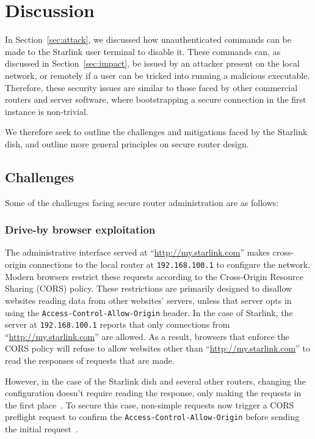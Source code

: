 \section{Discussion}\label{sec:discussion}

In Section~\ref{sec:attack}, we discussed how unauthenticated commands can be made to the Starlink user terminal to disable it.
These commands can, as discussed in Section~\ref{sec:impact}, be issued by an attacker present on the local network, or remotely if a user can be tricked into running a malicious executable.
Therefore, these security issues are similar to those faced by other commercial routers and server software, where bootstrapping a secure connection in the first instance is non-trivial.

We therefore seek to outline the challenges and mitigations faced by the Starlink dish, and outline more general principles on secure router design.

\subsection{Challenges}

Some of the challenges facing secure router administration are as follows:

\subsubsection{Drive-by browser exploitation}

The administrative interface served at ``\url{http://my.starlink.com}'' makes cross-origin connections to the local router at \texttt{192.168.100.1} to configure the network.
Modern browsers restrict these requests according to the Cross-Origin Resource Sharing (CORS) policy.
These restrictions are primarily designed to disallow websites reading data from other websites' servers, unless that server opts in using the \texttt{Access-Control-Allow-Origin} header.
In the case of Starlink, the server at \texttt{192.168.100.1} reports that only connections from ``\url{http://my.starlink.com}'' are allowed.
As a result, browsers that enforce the CORS policy will refuse to allow websites other than ``\url{http://my.starlink.com}'' to read the responses of requests that are made.

However, in the case of the Starlink dish and several other routers, changing the configuration doesn't require reading the response, only making the requests in the first place~\cite{drive_by_pharming}.
To secure this case, non-simple requests now trigger a CORS preflight request to confirm the \texttt{Access-Control-Allow-Origin} before sending the initial request~\cite{simple_requests, preflight_request}.

